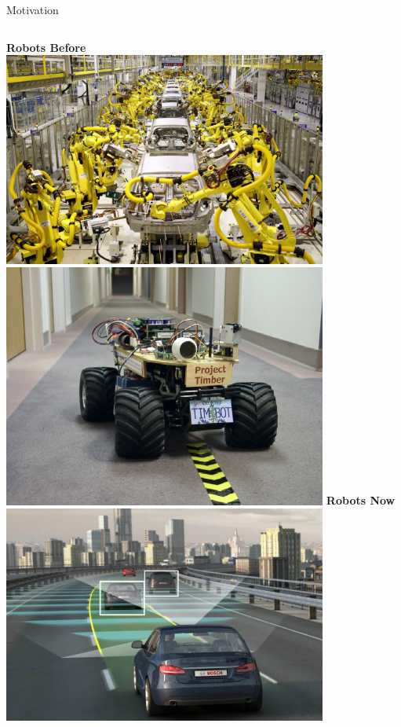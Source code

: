 \documentclass{beamer}
\begin{document}
\begin{frame}{Motivation}
\begin{columns}
\centering
\textbf{Robots Before}\\
\vspace{1em}
\includegraphics[width=0.8\textwidth]{img/assembly.jpg}\\
\vspace{1em}
\includegraphics[width=0.8\textwidth]{img/timbot.jpg}
\centering
\textbf{Robots Now}\\
\vspace{1em}
\includegraphics[width=0.8\textwidth]{img/selfdriving.jpg}\\

\end{columns}
\end{frame}
\end{document}
